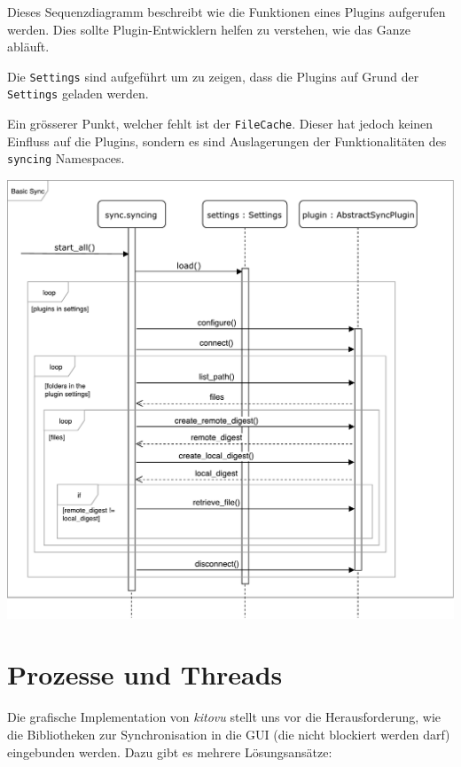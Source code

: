 \documentclass[a4paper]{article}
\let\oldsection\section
\renewcommand\section{\clearpage\oldsection}
\begin{document}
Dieses Sequenzdiagramm beschreibt wie die Funktionen eines Plugins aufgerufen werden.
Dies sollte Plugin-Entwicklern helfen zu verstehen, wie das Ganze abläuft.

Die \verb|Settings| sind aufgeführt um zu zeigen, dass die Plugins auf Grund der \verb|Settings| geladen werden.

Ein grösserer Punkt, welcher fehlt ist der \verb|FileCache|.
Dieser hat jedoch keinen Einfluss auf die Plugins, sondern es sind Auslagerungen der Funktionalitäten des \verb|syncing| Namespaces.

\includegraphics[width=40em]{./img/GrobesSequenzDiagramm.pdf}

\section{Prozesse und Threads}


Die grafische Implementation von \emph{kitovu} stellt uns vor die Herausforderung, wie die Bibliotheken zur Synchronisation in die GUI (die nicht blockiert werden darf) eingebunden werden. Dazu gibt es mehrere Lösungsansätze:
\end{document}
